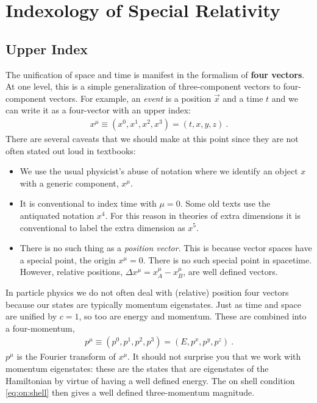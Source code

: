 \documentclass[12pt, oneside]{report}    %
\let\oldsection\section
\def\section{%
  \setcounter{sidenote}{1}%
  \oldsection
}
\begin{document}
\section{Indexology of Special Relativity}

\subsection{Upper Index}\label{sec:index:upper}

The unification of space and time is manifest in the formalism of \textbf{four vectors}. At one level, this is a simple generalization of three-component vectors to four-component vectors. For example, an \emph{event} is a position $\vec{x}$ and a time $t$ and we can write it as a four-vector with an upper index:
\begin{align}
    x^\mu \equiv (x^0, x^1, x^2, x^3) = (t,x,y,z) \ .
\end{align}
There are several caveats that we should make at this point since they are not often stated out loud in textbooks:
\begin{itemize}
    \item We use the usual physicist's abuse of notation where we identify an object $x$ with a generic component, $x^\mu$. 
    \item It is conventional to index time with $\mu=0$. Some old texts use the antiquated notation $x^4$. For this reason in theories of extra dimensions it is conventional to label the extra dimension as $x^5$. 
    \item There is no such thing as a \emph{position vector}. This is because vector spaces have a special point, the origin $x^\mu = 0$. There is no such special point in spacetime. However, relative positions, $\Delta x^\mu = x_A^\mu - x_B^\mu$, are well defined vectors. 
\end{itemize}
In particle physics we do not often deal with (relative) position four vectors because our states are typically momentum eigenstates. Just as time and space are unified by $c=1$, so too are energy and momentum. These are combined into a four-momentum,
\begin{align}
    p^\mu \equiv (p^0, p^1, p^2, p^3) = (E, p^x, p^y, p^z) \ .
    \label{eq:fourmomentum:upper}
\end{align}
$p^\mu$ is the Fourier transform of $x^\mu$. It should not surprise you that we work with momentum eigenstates: these are the states that are eigenstates of the Hamiltonian by virtue of having a well defined energy. The on shell condition \eqref{eq:on:shell} then gives a well defined three-momentum magnitude.
\end{document}
